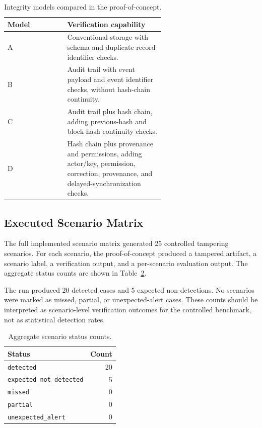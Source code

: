 \begin{table}[htbp]
\centering
\caption{Integrity models compared in the proof-of-concept.}
\label{tab:model-summary}
\small
\begin{tabular}{lp{0.62\linewidth}}
\toprule
Model & Verification capability \\
\midrule
A & Conventional storage with schema and duplicate record identifier checks. \\
B & Audit trail with event payload and event identifier checks, without hash-chain continuity. \\
C & Audit trail plus hash chain, adding previous-hash and block-hash continuity checks. \\
D & Hash chain plus provenance and permissions, adding actor/key, permission, correction, provenance, and delayed-synchronization checks. \\
\bottomrule
\end{tabular}
\end{table}

\subsection{Executed Scenario Matrix}

The full implemented scenario matrix generated 25 controlled tampering scenarios. For each scenario, the proof-of-concept produced a tampered artifact, a scenario label, a verification output, and a per-scenario evaluation output. The aggregate status counts are shown in Table~\ref{tab:status-counts}.

The run produced 20 detected cases and 5 expected non-detections. No scenarios were marked as missed, partial, or unexpected-alert cases. These counts should be interpreted as scenario-level verification outcomes for the controlled benchmark, not as statistical detection rates.

\begin{table}[htbp]
\centering
\caption{Aggregate scenario status counts.}
\label{tab:status-counts}
\begin{tabular}{lr}
\toprule
Status & Count \\
\midrule
\texttt{detected} & 20 \\
\texttt{expected\_not\_detected} & 5 \\
\texttt{missed} & 0 \\
\texttt{partial} & 0 \\
\texttt{unexpected\_alert} & 0 \\
\bottomrule
\end{tabular}
\end{table}

